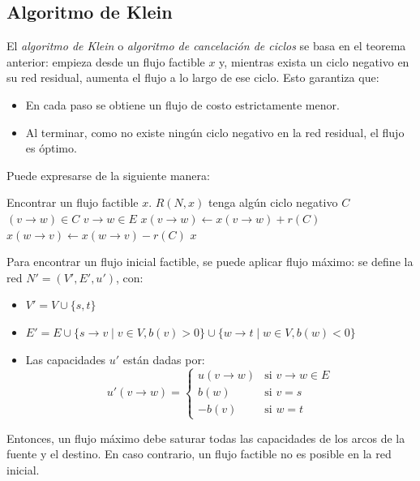 \documentclass[a4paper]{report}
\newcommand{\si}{\text{si }}
\newcommand{\Each}{\kw{each}\ }
\begin{document}
\subsection{Algoritmo de Klein}

El \textit{algoritmo de Klein} o \textit{algoritmo de cancelación de ciclos} se basa en el teorema anterior: empieza desde un flujo factible $x$ y, mientras exista un ciclo negativo en su red residual, aumenta el flujo a lo largo de ese ciclo. Esto garantiza que:
\begin{itemize}
    \item En cada paso se obtiene un flujo de costo estrictamente menor.
    \item Al terminar, como no existe ningún ciclo negativo en la red residual, el flujo es óptimo.
\end{itemize}

Puede expresarse de la siguiente manera:

\begin{codebox}
    \li Encontrar un flujo factible $x$.
    \li \While $R(N, x)$ tenga algún ciclo negativo $C$ \Do
    \li \For \Each $(v \rightarrow w) \in C$ \Do
    \li \If $v \rightarrow w \in E$ \Then
    \li $x(v \rightarrow w) \gets x(v \rightarrow w) + r(C)$
    \li \Else
    \li $x(w \rightarrow v) \gets x(w \rightarrow v) - r(C)$
    \End
    \End
    \End
    \Return $x$
\end{codebox}

Para encontrar un flujo inicial factible, se puede aplicar flujo máximo: se define la red $N' = (V', E', u')$, con:
\begin{itemize}
    \item $V' = V \cup \{s, t\}$
    \item $E' = E \cup \{s \rightarrow v \mid v \in V, b(v) > 0\} \cup \{w \rightarrow t \mid w \in V, b(w) < 0\}$
    \item Las capacidades $u'$ están dadas por:
          $$
              u'(v \rightarrow w) =
              \begin{cases}
                  u(v \rightarrow w) & \si v \rightarrow w \in E \\
                  b(w)               & \si v = s                 \\
                  -b(v)              & \si w = t
              \end{cases}
          $$
\end{itemize}

Entonces, un flujo máximo debe saturar todas las capacidades de los arcos de la fuente y el destino. En caso contrario, un flujo factible no es posible en la red inicial. %
\end{document}
